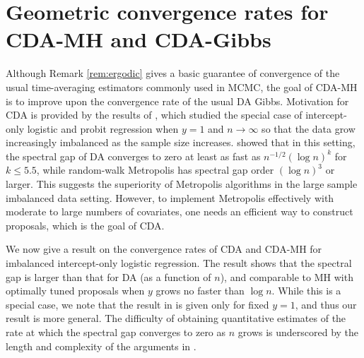 \documentclass[twoside,11pt]{article}
\newcommand{\1}{\mathbf 1}
\begin{document}
{{\section{Geometric convergence rates for CDA-MH and CDA-Gibbs}
}
Although Remark \ref{rem:ergodic} gives a basic guarantee of convergence of the usual time-averaging estimators commonly used in MCMC, the goal of CDA-MH is to improve upon the convergence rate of the usual DA Gibbs. Motivation for CDA is provided by the results of \cite{johndrow2016inefficiency}, which studied the special case of intercept-only logistic and probit regression when $y=1$ and $n \to \infty$ so that the data grow increasingly imbalanced as the sample size increases. \citet{johndrow2016inefficiency} showed that in this setting, the spectral gap of DA converges to zero at least as fast as $n^{-1/2} (\log n)^k$ for $k \le 5.5$, while random-walk Metropolis has spectral gap order $(\log n)^3$ or larger. This suggests the superiority of Metropolis algorithms in the large sample imbalanced data setting. However, to implement Metropolis effectively with moderate to large numbers of covariates, one needs an efficient way to construct proposals, which is the goal of CDA.

We now give a result on the convergence rates of CDA and CDA-MH for imbalanced intercept-only logistic regression. The result shows that the spectral gap is larger than that for DA (as a function of $n$), and comparable to MH with optimally tuned proposals when $y$ grows no faster than $\log n$. While this is a special case, we note that the result in \cite{johndrow2016inefficiency} is given only for fixed $y=1$, and thus our result is more general. The difficulty of obtaining quantitative estimates of the rate at which the spectral gap converges to zero as $n$ grows is underscored by the length and complexity of the arguments in \citet{johndrow2016inefficiency}. 

}
\end{document}
